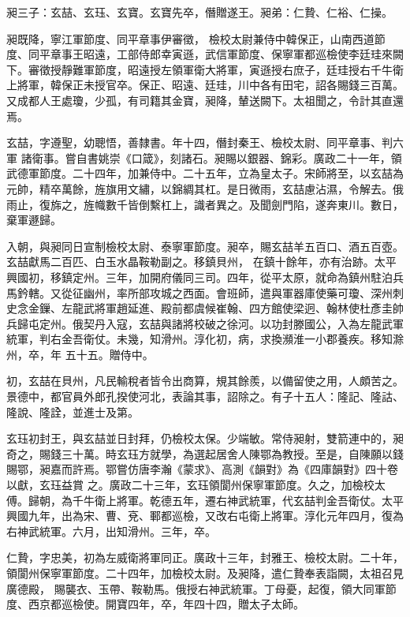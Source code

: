 \begin{pinyinscope}
 昶三子：玄喆、玄珏、玄寶。玄寶先卒，僭贈遂王。昶弟：仁贄、仁裕、仁操。



 昶既降，寧江軍節度、同平章事伊審徵，
 檢校太尉兼侍中韓保正，山南西道節度、同平章事王昭遠，工部侍郎幸寅遜，武信軍節度、保寧軍都巡檢使李廷珪來闕下。審徵授靜難軍節度，昭遠授左領軍衛大將軍，寅遜授右庶子，廷珪授右千牛衛上將軍，韓保正未授官卒。保正、昭遠、廷珪，川中各有田宅，詔各賜錢三百萬。又成都人王處瓊，少孤，有司籍其金寶，昶降，輦送闕下。太祖聞之，令計其直還焉。



 玄喆，字遵聖，幼聰悟，善隸書。年十四，僭封秦王、檢校太尉、同平章事、判六軍
 諸衛事。嘗自書姚崇《口箴》，刻諸石。昶賜以銀器、錦彩。廣政二十一年，領武德軍節度。二十四年，加兼侍中。二十五年，立為皇太子。宋師將至，以玄喆為元帥，精卒萬餘，旌旗用文繡，以錦綢其杠。是日微雨，玄喆慮沾濕，令解去。俄雨止，復旆之，旌幟數千皆倒繫杠上，識者異之。及聞劍門陷，遂奔東川。數日，棄軍遯歸。



 入朝，與昶同日宣制檢校太尉、泰寧軍節度。昶卒，賜玄喆羊五百口、酒五百壺。玄喆獻馬二百匹、白玉水晶鞍勒副之。移鎮貝州，
 在鎮十餘年，亦有治跡。太平興國初，移鎮定州。三年，加開府儀同三司。四年，從平太原，就命為鎮州駐泊兵馬鈐轄。又從征幽州，率所部攻城之西面。會班師，遣與軍器庫使藥可瓊、深州刺史念金鏁、左龍武將軍趙延進、殿前都虞候崔翰、四方館使梁迥、翰林使杜彥圭帥兵歸屯定州。俄契丹入寇，玄喆與諸將校破之徐河。以功封滕國公，入為左龍武軍統軍，判右金吾衛仗。未幾，知滑州。淳化初，病，求換瀕淮一小郡養疾。移知滁州，卒，年
 五十五。贈侍中。



 初，玄喆在貝州，凡民輸稅者皆令出商算，規其餘羨，以備留使之用，人頗苦之。景德中，都官員外郎孔揆使河北，表論其事，詔除之。有子十五人：隆記、隆詁、隆說、隆詮，並進士及第。



 玄珏初封王，與玄喆並日封拜，仍檢校太保。少端敏。常侍昶射，雙箭連中的，昶奇之，賜錢三十萬。時玄珏方就學，為選起居舍人陳鄂為教授。至是，自陳願以錢賜鄂，昶嘉而許焉。鄂嘗仿唐李瀚《蒙求》、高測《韻對》為《四庫韻對》四十卷以獻，玄珏益賞
 之。廣政二十三年，玄珏領閬州保寧軍節度。久之，加檢校太傅。歸朝，為千牛衛上將軍。乾德五年，遷右神武統軍，代玄喆判金吾衛仗。太平興國九年，出為宋、曹、兗、鄆都巡檢，又改右屯衛上將軍。淳化元年四月，復為右神武統軍。六月，出知滑州。三年，卒。



 仁贄，字忠美，初為左威衛將軍同正。廣政十三年，封雅王、檢校太尉。二十年，領閬州保寧軍節度。二十四年，加檢校太尉。及昶降，遣仁贄奉表詣闕，太祖召見廣德殿，
 賜襲衣、玉帶、鞍勒馬。俄授右神武統軍。丁母憂，起復，領大同軍節度、西京都巡檢使。開寶四年，卒，年四十四，贈太子太師。




\end{pinyinscope}
